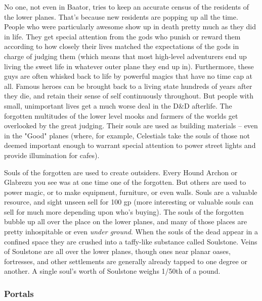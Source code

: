 No one, not even in Baator, tries to keep an accurate census of the residents of the lower planes. That's because new residents are popping up all the time. People who were particularly awesome show up in death pretty much as they did in life. They get special attention from the gods who punish or reward them according to how closely their lives matched the expectations of the gods in charge of judging them (which means that most high-level adventurers end up living the sweet life in whatever outer plane they end up in). Furthermore, these guys are often whisked back to life by powerful magics that have no time cap at all. Famous heroes can be brought back to a living state hundreds of years after they die, and retain their sense of self continuously throughout. But people with small, unimportant lives get a much worse deal in the D\&D afterlife. The forgotten multitudes of the lower level mooks and farmers of the worlds get overlooked by the great judging. Their souls are used as building materials -- even in the "Good" planes (where, for example, Celestials take the souls of those not deemed important enough to warrant special attention to power street lights and provide illumination for cafes).

Souls of the forgotten are used to create outsiders. Every Hound Archon or Glabrezu you see was at one time one of the forgotten. But others are used to power magic, or to make equipment, furniture, or even walls. Souls are a valuable resource, and sight unseen sell for 100 gp (more interesting or valuable souls can sell for much more depending upon who's buying). The souls of the forgotten bubble up all over the place on the lower planes, and many of those places are pretty inhospitable or even \textit{under ground}. When the souls of the dead appear in a confined space they are crushed into a taffy-like substance called Soulstone. Veins of Soulstone are all over the lower planes, though ones near planar oases, fortresses, and other settlements are generally already tapped to one degree or another. A single soul's worth of Soulstone weighs 1/50th of a pound.

\subsubsection{Portals}

